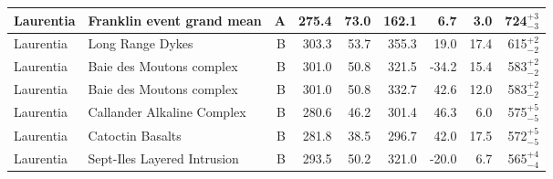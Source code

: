 \begin{longtable}{p{1 in}p{1 in}rrrrrrr}
                     Laurentia &                          Franklin event grand mean &      A &     275.4 &      73.0 & 162.1 &   6.7 &       3.0 &      724$^{+3}_{-3}$ \\ \hline
                     Laurentia &                                   Long Range Dykes &      B &     303.3 &      53.7 & 355.3 &  19.0 &      17.4 &      615$^{+2}_{-2}$ \\ \hline
                     Laurentia &                           Baie des Moutons complex &      B &     301.0 &      50.8 & 321.5 & -34.2 &      15.4 &      583$^{+2}_{-2}$ \\ \hline
                     Laurentia &                           Baie des Moutons complex &      B &     301.0 &      50.8 & 332.7 &  42.6 &      12.0 &      583$^{+2}_{-2}$ \\ \hline
                     Laurentia &                         Callander Alkaline Complex &      B &     280.6 &      46.2 & 301.4 &  46.3 &       6.0 &      575$^{+5}_{-5}$ \\ \hline
                     Laurentia &                                   Catoctin Basalts &      B &     281.8 &      38.5 & 296.7 &  42.0 &      17.5 &      572$^{+5}_{-5}$ \\ \hline
                     Laurentia &                        Sept-Iles Layered Intrusion &      B &     293.5 &      50.2 & 321.0 & -20.0 &       6.7 &      565$^{+4}_{-4}$ \\ \hline
\end{longtable}
